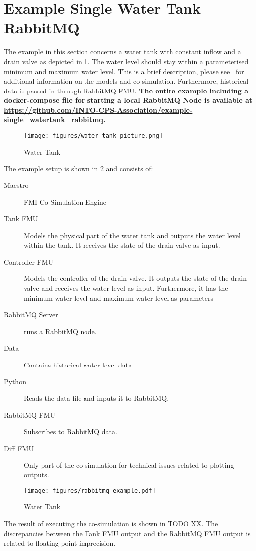 \section{Example Single Water Tank RabbitMQ}\label{sec:example-watertank}
The example in this section concerns a water tank with constant inflow and a
drain valve as depicted in \cref{fig:water-tank-picture}. The water level should
stay within a parameterised minimum and maximum water level. This is a brief
description, please see~\cite{INTOCPSD3.6} for additional information on
the models and co-simulation. Furthermore, historical data is passed in through
RabbitMQ FMU. \textbf{The entire example including a docker-compose file for
  starting a local RabbitMQ Node is available at \url{https://github.com/INTO-CPS-Association/example-single_watertank_rabbitmq}.}
\begin{figure}[!htb]
  \centering
  \texttt{[image: figures/water-tank-picture.png]}
  \caption{Water Tank}
  \label{fig:water-tank-picture}
\end{figure}

The example setup is shown in \cref{fig:rabbitmq-example} and consists of:
\begin{description}
  \item[Maestro] FMI Co-Simulation Engine
    \item[Tank FMU] Models the physical part of the water tank and outputs the
    water level within the tank. It receives the state of the drain valve as input.
    \item[Controller FMU] Models the controller of the drain valve. It outputs
    the state of the drain valve and receives the water level as input.
    Furthermore, it has the minimum water level and maximum water level as
    parameters
    \item[RabbitMQ Server] runs a RabbitMQ node.
  \item[Data] Contains historical water level data.
  \item[Python] Reads the data file and inputs it to RabbitMQ.
  \item[RabbitMQ FMU] Subscribes to RabbitMQ data.
    \item[Diff FMU] Only part of the co-simulation for technical issues related to plotting outputs.
\end{description}
\begin{figure}[!htb]
  \centering
  \texttt{[image: figures/rabbitmq-example.pdf]}
  \caption{Water Tank}
  \label{fig:rabbitmq-example}
\end{figure}

The result of executing the co-simulation is shown in TODO XX. The discrepancies
between the Tank FMU output and the RabbitMQ FMU output is related to
floating-point imprecision.



